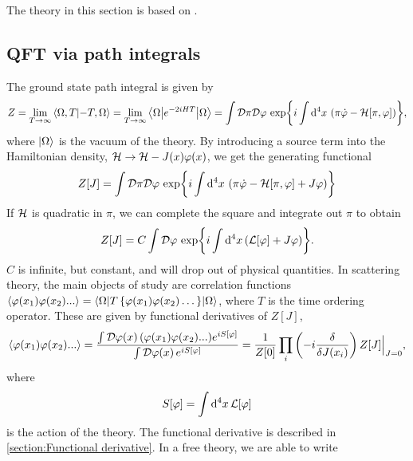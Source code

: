 \label{Free energy and the effective action}
The theory in this section is based on \cite{Peskin:IntroQFT,weinberg_1995,weinberg_1996_vol2,Schwartz:QFT}.

\subsection{QFT via path integrals}
\label{section:path integral}
The ground state path integral is given by
\begin{equation}
    Z = \lim_{T\rightarrow \infty} \braket{\Omega, T}{-T, \Omega}
    = \lim_{T\rightarrow \infty} \left\langle \Omega {\left|  e^{-2iHT}  \right|} \Omega \right\rangle
    = \int \mathcal{D} \pi \mathcal{D} \varphi \, \exp{ i \int \dd^4 x \, \left(\pi \dot \varphi - \mathcal{H}[\pi, \varphi]\right) },
\end{equation}
where $\ket{\Omega}$ is the vacuum of the theory.
By introducing a source term into the Hamiltonian density, $\mathcal{H} \rightarrow \mathcal{H} - J(x)\varphi(x)$, we get the generating functional
\begin{equation}
    Z[J] = 
    \int \mathcal{D} \pi \mathcal{D} \varphi \, 
    \exp{ i \int \dd^4 x \, \left(\pi \dot \varphi - \mathcal{H}[\pi, \varphi]+ J\varphi\right) }
\end{equation}
If $\mathcal{H}$ is quadratic in $\pi$, we can complete the square and integrate out $\pi$ to obtain
\begin{equation}
    Z[J] = C \int \mathcal{D} \varphi \, \exp{i \int \dd^4 x\, (\mathcal{L}[\varphi] + J \varphi)}.
\end{equation}
$C$ is infinite, but constant, and will drop out of physical quantities.
In scattering theory, the main objects of study are correlation functions $\ex{\varphi(x_1)\varphi(x_2)...} = \inner{\Omega}{T\left\{\varphi(x_1)\varphi(x_2)\dots\right\}}{\Omega}$, where $T$ is the time ordering operator.
These are given by functional derivatives of $Z[J]$, 
\begin{equation}
    \label{correlator from generating functional}
    \ex{\varphi(x_1)\varphi(x_2)...}
    = 
    \frac{\int \D \varphi(x)\,  (\varphi(x_1)\varphi(x_2)...) e^{i S[\varphi]}}
        {\int \D \varphi(x)\, e^{i S[\varphi]}}
    =
    \frac{1}{Z[0]} \prod_i\left( -i  \fdv{J(x_i)}\right) Z[J]\Big|_{J = 0},
\end{equation}
where 
\begin{equation}
    S[\varphi] = \int \dd^4 x \, \mathcal{L}[\varphi]
\end{equation}
is the action of the theory.
The functional derivative is described in \autoref{section:Functional derivative}.
In a free theory, we are able to write
